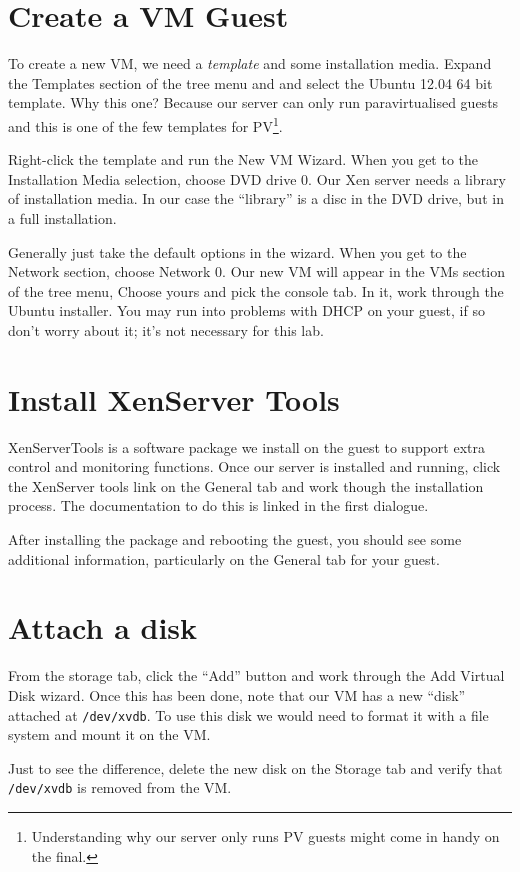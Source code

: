 \documentclass{article}
\begin{document}
 
\section{Create a VM Guest} 
 To create a new VM, we need a \emph{template} and some installation media. Expand the Templates section of the 
 tree menu and  and select the Ubuntu 12.04 64 bit template. Why this one? Because our server can only run 
 paravirtualised guests and this is one of the few templates for PV\footnote{Understanding why our server only runs
 PV guests might come in handy on the final.}.
 
 Right-click the template and run the New VM Wizard. When you get to the Installation Media selection, choose DVD drive 0. Our Xen server needs a library of installation media. In our case the ``library'' is a disc in the DVD drive, but in 
 a full installation.
 
 Generally just take the default options in the wizard. When you get to the Network section, choose Network 0.
 Our new VM will appear in the VMs section of the tree menu, Choose yours and pick the console tab. In it, work through 
 the Ubuntu installer. You may run into problems with DHCP on your guest, if so don't worry about it; it's not necessary
 for this lab.

\section{Install XenServer Tools}
XenServerTools is a software package we install on the guest to support extra control and monitoring functions. Once 
our server is installed and running, click the XenServer tools link on the General tab and work though the installation 
process. The documentation to do this is linked in the first dialogue.

After installing the package and rebooting the guest, you should see some additional information, particularly on the General tab for your guest.

\section{Attach a disk}
From the storage tab, click the ``Add'' button and work through the Add Virtual Disk wizard. Once this has been done,
note that our VM has a new ``disk'' attached at \texttt{/dev/xvdb}. To use this disk we would need to format it with a file 
system and mount it on the VM.

Just to see the difference, delete the new disk on the Storage tab and verify that \texttt{/dev/xvdb} is removed from the 
VM.
\end{document}
